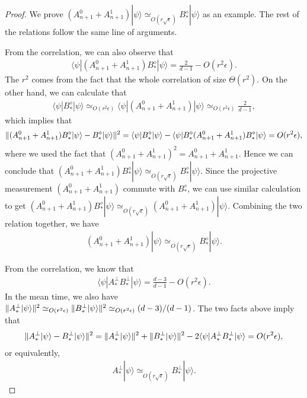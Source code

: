 \documentclass[11pt,letterpaper]{article}
\newcommand{\ket}[1]{|#1\rangle}
\newcommand{\bra}[1]{\langle#1|}
\DeclarePairedDelimiter{\norm}{\lVert}{\rVert}
\newcommand{\1}{\mathbb{1}}
\newcommand{\ep}{\epsilon}
\newcommand{\se}{\sqrt{\epsilon}}
\newcommand{\appd}[1]{\simeq_{#1}}
\theoremstyle{definition}
\begin{document}
\begin{proof} 
We prove $(A_{n+1}^0+A_{n+1}^1)\ket{\psi} \appd{O(r\se)} B_\ast^\diamond \ket{\psi}$ as an example.
The rest of the relations follow the same line of arguments.

From the correlation, we can also observe that
\begin{align}
 \bra{\psi} (A_{n+1}^0+A_{n+1}^1)B_\ast^\diamond \ket{\psi} = \frac{2}{d-1} - O(r^2 \epsilon).
\end{align}
The $r^2$ comes from the fact that the whole correlation of size $\Theta(r^2)$.
On the other hand, we can calculate that 
\begin{align}
	\bra{\psi} B_\ast^\diamond \ket{\psi} \appd{O(r^2\epsilon)} 
 \bra{\psi}(A_{n+1}^0+A_{n+1}^1)\ket{\psi} \appd{O(r^2\epsilon)} \frac{2}{d-1},
\end{align}
which implies that 
\begin{align}
	\norm{(A_{n+1}^0 + A_{n+1}^1)B_\ast^\diamond \ket{\psi} - B_\ast^\diamond\ket{\psi}}^2 
	= \bra{\psi} B_\ast^\diamond \ket{\psi} - \bra{\psi}B_\ast^\diamond(A_{n+1}^0 + A_{n+1}^1)B_\ast^\diamond \ket{\psi}
	= O(r^2 \epsilon),
\end{align}
where we used the fact that $(A_{n+1}^0 + A_{n+1}^1)^2 = A_{n+1}^0 + A_{n+1}^1$.
Hence we can conclude that $(A_{n+1}^0 + A_{n+1}^1)B_\ast^\diamond \ket{\psi} \appd{O(r\se)} B_\ast^\diamond\ket{\psi}$.
Since the projective measurement $(A_{n+1}^0+A_{n+1}^1)$ commute with $B_\ast^\diamond$, we can use similar calculation to get
$(A_{n+1}^0 + A_{n+1}^1)B_\ast^\diamond \ket{\psi} \appd{O(r\se)} (A_{n+1}^0 + A_{n+1}^1)\ket{\psi}$.
Combining the two relation together, we have
\begin{align}
	(A_{n+1}^0 + A_{n+1}^1) \ket{\psi} \appd{O(r\se)} B_\ast^\diamond \ket{\psi}.
\end{align}

From the correlation, we know that 
\begin{align}
	\bra{\psi} A_\ast^\perp B_\ast^\perp \ket{\psi} = \frac{d-3}{d-1} - O(r^2 \ep).
\end{align}
In the mean time, we also have 
$\norm{A_\ast^\perp \ket{\psi}}^2 \appd{O(r^2\ep)} \norm{B_\ast^\perp\ket{\psi}}^2 \appd{O(r^2\ep)} (d-3)/(d-1)$.
The two facts above imply that 
\begin{align}
	\norm{A_\ast^\perp \ket{\psi} - B_\ast^\perp \ket{\psi}}^2 = \norm{A_\ast^\perp \ket{\psi}}^2 + \norm{B_\ast^\perp \ket{\psi}}^2
	- 2 \bra{\psi} A_\ast^\perp B_\ast^\perp \ket{\psi}  = O(r^2 \ep),
\end{align}
or equivalently,
\begin{align}
	A_\ast^\perp \ket{\psi} \appd{O(r\se)} B_\ast^\perp \ket{\psi}.
\end{align}
\end{proof}
\end{document}

